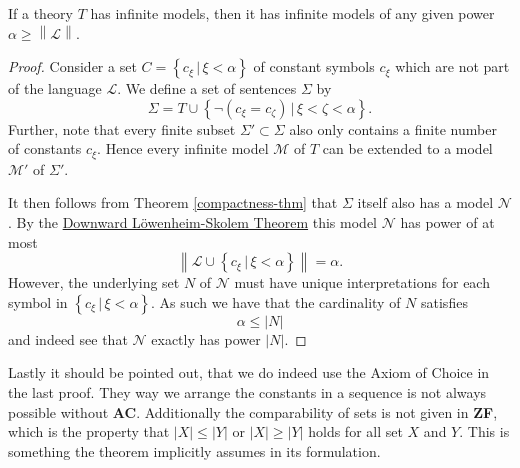 \documentclass[../../main.tex]{subfiles}
\begin{document}
\begin{theorem}\label{up-lowenheim-skolem}\cite[Corollary 2.1.6]{Cha90}
    If a theory $T$ has infinite models, then it has infinite models of any given power $\alpha \geq \left\lVert \mathcal{L} \right\rVert$.
\end{theorem}

\begin{proof}
    Consider a set $C = \left\{c_\xi \,\vert\, \xi < \alpha\right\}$ of constant symbols $c_\xi$ which are not part of the language $\mathcal{L}$.
    We define a set of sentences $\Sigma$ by
    $$\Sigma = T \cup \left\{\lnot (c_\xi = c_\zeta) \,\vert\, \xi < \zeta < \alpha\right\}.$$
    Further, note that every finite subset $\Sigma' \subset \Sigma$ also only contains a finite number of constants $c_\xi$.
    Hence every infinite model $\mathcal{M}$ of $T$ can be extended to a model $\mathcal{M}'$ of $\Sigma'$.

    It then follows from Theorem \ref{compactness-thm} that $\Sigma$ itself also has a model $\mathcal{N}$.
    By the \hyperref[down-lowenheim-skolem]{Downward Löwenheim-Skolem Theorem} this model   $\mathcal{N}$ has power of at most
    $$\left\lVert \mathcal{L} \cup \left\{c_\xi \,\vert\, \xi < \alpha\right\}\right\rVert = \alpha.$$
    However, the underlying set $N$ of $\mathcal{N}$ must have unique interpretations for each symbol in $\left\{c_\xi \,\vert\, \xi < \alpha\right\}$.
    As such we have that the cardinality of $N$ satisfies
    $$\alpha \leq \left\lvert N\right\rvert$$
    and indeed see that $\mathcal{N}$ exactly has power $\left\lvert N\right\rvert$.
\end{proof}

Lastly it should be pointed out, that we do indeed use the Axiom of Choice in the last proof.
They way we arrange the constants in a sequence is not always possible without \textbf{AC}.
Additionally the comparability of sets is not given in \textbf{ZF}, which is the property that $\left\lvert X\right\rvert \leq \left\lvert Y\right\rvert$ or $\left\lvert X\right\rvert \geq \left\lvert Y\right\rvert$ holds for all set $X$ and $Y$.
This is something the theorem implicitly assumes in its formulation.
\end{document}
